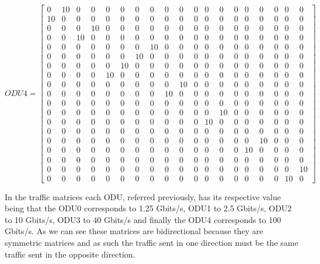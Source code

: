 \[
ODU4=
  \begin{bmatrix}
    0 & 10 & 0 & 0 & 0 & 0 & 0 & 0 & 0 & 0 & 0 & 0 & 0 & 0 & 0 & 0 & 0 & 0 & 0 \\
    10 & 0 & 0 & 0 & 0 & 0 & 0 & 0 & 0 & 0 & 0 & 0 & 0 & 0 & 0 & 0 & 0 & 0 & 0 \\
    0 & 0 & 0 & 10 & 0 & 0 & 0 & 0 & 0 & 0 & 0 & 0 & 0 & 0 & 0 & 0 & 0 & 0 & 0 \\
    0 & 0 & 10 & 0 & 0 & 0 & 0 & 0 & 0 & 0 & 0 & 0 & 0 & 0 & 0 & 0 & 0 & 0 & 0 \\
    0 & 0 & 0 & 0 & 0 & 0 & 0 & 10 & 0 & 0 & 0 & 0 & 0 & 0 & 0 & 0 & 0 & 0 & 0 \\
    0 & 0 & 0 & 0 & 0 & 0 & 10 & 0 & 0 & 0 & 0 & 0 & 0 & 0 & 0 & 0 & 0 & 0 & 0 \\
    0 & 0 & 0 & 0 & 0 & 10 & 0 & 0 & 0 & 0 & 0 & 0 & 0 & 0 & 0 & 0 & 0 & 0 & 0 \\
    0 & 0 & 0 & 0 & 10 & 0 & 0 & 0 & 0 & 0 & 0 & 0 & 0 & 0 & 0 & 0 & 0 & 0 & 0 \\
    0 & 0 & 0 & 0 & 0 & 0 & 0 & 0 & 0 & 10 & 0 & 0 & 0 & 0 & 0 & 0 & 0 & 0 & 0 \\
    0 & 0 & 0 & 0 & 0 & 0 & 0 & 0 & 10 & 0 & 0 & 0 & 0 & 0 & 0 & 0 & 0 & 0 & 0 \\
    0 & 0 & 0 & 0 & 0 & 0 & 0 & 0 & 0 & 0 & 0 & 0 & 0 & 0 & 0 & 0 & 0 & 0 & 0 \\
    0 & 0 & 0 & 0 & 0 & 0 & 0 & 0 & 0 & 0 & 0 & 0 & 10 & 0 & 0 & 0 & 0 & 0 & 0 \\
    0 & 0 & 0 & 0 & 0 & 0 & 0 & 0 & 0 & 0 & 0 & 10 & 0 & 0 & 0 & 0 & 0 & 0 & 0 \\
    0 & 0 & 0 & 0 & 0 & 0 & 0 & 0 & 0 & 0 & 0 & 0 & 0 & 0 & 0 & 0 & 0 & 0 & 0 \\
    0 & 0 & 0 & 0 & 0 & 0 & 0 & 0 & 0 & 0 & 0 & 0 & 0 & 0 & 0 & 10 & 0 & 0 & 0 \\
    0 & 0 & 0 & 0 & 0 & 0 & 0 & 0 & 0 & 0 & 0 & 0 & 0 & 0 & 10 & 0 & 0 & 0 & 0 \\
    0 & 0 & 0 & 0 & 0 & 0 & 0 & 0 & 0 & 0 & 0 & 0 & 0 & 0 & 0 & 0 & 0 & 0 & 0 \\
    0 & 0 & 0 & 0 & 0 & 0 & 0 & 0 & 0 & 0 & 0 & 0 & 0 & 0 & 0 & 0 & 0 & 0 & 10 \\
    0 & 0 & 0 & 0 & 0 & 0 & 0 & 0 & 0 & 0 & 0 & 0 & 0 & 0 & 0 & 0 & 0 & 10 & 0
  \end{bmatrix}
\]

\vspace{11pt}
In the traffic matrices each ODU, referred previously, has its respective value being that the ODU0 corresponds to 1.25 Gbits/s, ODU1 to 2.5 Gbits/s, ODU2 to 10 Gbits/s, ODU3 to 40 Gbits/s and finally the ODU4 corresponds to 100 Gbits/s.
As we can see these matrices are bidirectional because they are symmetric matrices and as such the traffic sent in one direction must be the same traffic sent in the opposite direction.

